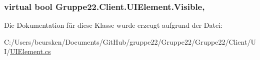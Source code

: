 \hypertarget{class_gruppe22_1_1_client_1_1_u_i_element_aca55877aac91389344724502b743dd56}{
\subsubsection[{Visible}]{\setlength{\rightskip}{0pt plus 5cm}virtual bool Gruppe22.\-Client.\-U\-I\-Element.\-Visible\hspace{0.3cm}{\ttfamily [get]}, {\ttfamily [set]}}}\label{class_gruppe22_1_1_client_1_1_u_i_element_aca55877aac91389344724502b743dd56}


Die Dokumentation für diese Klasse wurde erzeugt aufgrund der Datei\-:\begin{DoxyCompactItemize}
\item 
C\-:/\-Users/beursken/\-Documents/\-Git\-Hub/gruppe22/\-Gruppe22/\-Gruppe22/\-Client/\-U\-I/\hyperlink{_u_i_element_8cs}{U\-I\-Element.\-cs}\end{DoxyCompactItemize}
